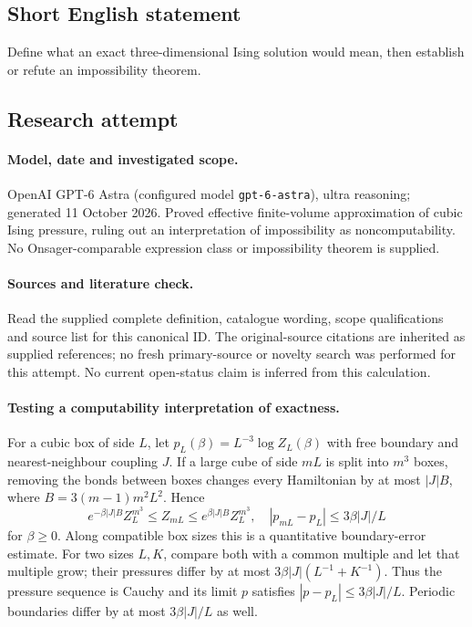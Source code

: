 \documentclass[11pt]{article}
\begin{document}
\subsection{Short English statement}
Define what an exact three-dimensional Ising solution would mean, then establish or refute an impossibility theorem.
\subsection{Research attempt}
\paragraph{Model, date and investigated scope.}
OpenAI GPT-6 Astra (configured model \texttt{gpt-6-astra}), ultra reasoning; generated 11 October 2026. Proved effective finite-volume approximation of cubic Ising pressure, ruling out an interpretation of impossibility as noncomputability. No Onsager-comparable expression class or impossibility theorem is supplied.

\paragraph{Sources and literature check.}
Read the supplied complete definition, catalogue wording, scope qualifications and source list for this canonical ID. The original-source citations are inherited as supplied references; no fresh primary-source or novelty search was performed for this attempt. No current open-status claim is inferred from this calculation.

\paragraph{Testing a computability interpretation of exactness.}For a cubic box of side \(L\), let \(p_L(\beta)=L^{-3}\log Z_L(\beta)\) with free boundary and nearest-neighbour coupling \(J\). If a large cube of side \(mL\) is split into \(m^3\) boxes, removing the bonds between boxes changes every Hamiltonian by at most \(|J|B\), where \(B=3(m-1)m^2L^2\). Hence
\[e^{-\beta|J|B}Z_L^{m^3}\le Z_{mL}\le e^{\beta|J|B}Z_L^{m^3},\quad
|p_{mL}-p_L|\le 3\beta|J|/L\]
for \(\beta\ge0\). Along compatible box sizes this is a quantitative boundary-error estimate. For two sizes \(L,K\), compare both with a common multiple and let that multiple grow; their pressures differ by at most \(3\beta|J|(L^{-1}+K^{-1})\). Thus the pressure sequence is Cauchy and its limit \(p\) satisfies \(|p-p_L|\le3\beta|J|/L\). Periodic boundaries differ by at most \(3\beta|J|/L\) as well.
\end{document}
